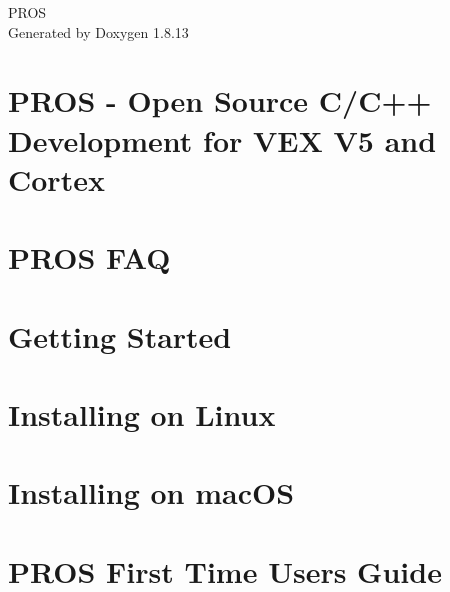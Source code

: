 \documentclass[twoside]{book}
\newcommand{\+}{\discretionary{\mbox{\scriptsize$\hookleftarrow$}}{}{}}
\newcommand{\clearemptydoublepage}{%
  \newpage{\pagestyle{empty}\cleardoublepage}%
}
\begin{document}
\hypersetup{pageanchor=false,
             bookmarksnumbered=true,
             pdfencoding=unicode
            }
\begin{titlepage}
\vspace*{7cm}
\begin{center}%
{\Large P\+R\+OS }\\
\vspace*{1cm}
{\large Generated by Doxygen 1.8.13}\\
\end{center}
\end{titlepage}
\clearemptydoublepage
{}
\tableofcontents
\clearemptydoublepage
{}
\hypersetup{pageanchor=true}

\chapter{P\+R\+OS -\/ Open Source C/\+C++ Development for V\+EX V5 and Cortex}
\label{index}\hypertarget{index}{}
\chapter{P\+R\+OS F\+AQ}
\label{md_docs_getting-started_faq}

\chapter{Getting Started}
\label{md_docs_getting-started_index}

\chapter{Installing on Linux}
\label{md_docs_getting-started_linux}

\chapter{Installing on mac\+OS}
\label{md_docs_getting-started_macos}

\chapter{P\+R\+OS First Time Users Guide}
\label{md_docs_getting-started_new-users}

\end{document}

